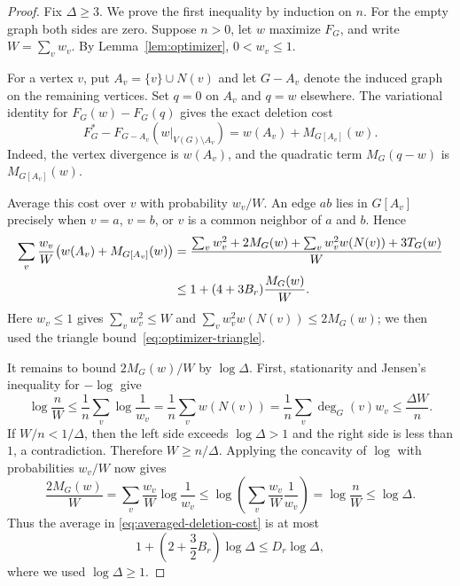 \begin{proof}
Fix $\Delta\ge3$.  We prove the first inequality by induction on $n$.
For the empty graph both sides are zero.  Suppose $n>0$, let $w$ maximize
$F_G$, and write $W=\sum_v w_v$.  By Lemma~\ref{lem:optimizer},
$0<w_v\le1$.

For a vertex $v$, put $A_v=\{v\}\cup N(v)$ and let
$G-A_v$ denote the induced graph on the remaining vertices.
Set $q=0$ on $A_v$ and $q=w$ elsewhere.  The variational identity
for $F_G(w)-F_G(q)$ gives the exact deletion cost
\begin{equation}
 F_G^*-F_{G-A_v}(w|_{V(G)\setminus A_v})
 =w(A_v)+M_{G[A_v]}(w).
 \label{eq:closed-neighborhood-cost}
\end{equation}
Indeed, the vertex divergence is $w(A_v)$, and the quadratic term
$M_G(q-w)$ is $M_{G[A_v]}(w)$.

Average this cost over $v$ with probability $w_v/W$.
An edge $ab$ lies in $G[A_v]$ precisely when $v=a$, $v=b$, or
$v$ is a common neighbor of $a$ and $b$.  Hence
\begin{align}
 \sum_v\frac{w_v}{W}
       \bigl(w(A_v)+M_{G[A_v]}(w)\bigr)
 &=\frac{\sum_v w_v^2+2M_G(w)
       +\sum_v w_v^2w(N(v))+3T_G(w)}{W} \notag\\
 &\le 1+(4+3B_r)\frac{M_G(w)}{W}.
 \label{eq:averaged-deletion-cost}
\end{align}
Here $w_v\le1$ gives $\sum_vw_v^2\le W$ and
$\sum_vw_v^2w(N(v))\le2M_G(w)$; we then used the triangle
bound~\eqref{eq:optimizer-triangle}.

It remains to bound $2M_G(w)/W$ by $\log\Delta$. First, stationarity
and Jensen's inequality for $-\log$ give
\begin{equation}
 \log\frac{n}{W}
 \le \frac1n\sum_v\log\frac1{w_v}
 =\frac1n\sum_v w(N(v))
 =\frac1n\sum_v \deg_G(v)w_v
 \le \frac{\Delta W}{n}.
 \label{eq:optimizer-total-weight}
\end{equation}
If $W/n<1/\Delta$, then the left side exceeds $\log\Delta>1$
and the right side is less than $1$, a contradiction. Therefore
$W\ge n/\Delta$. Applying the concavity of $\log$ with probabilities
$w_v/W$ now gives
\begin{equation}
 \frac{2M_G(w)}{W}
 =\sum_v\frac{w_v}{W}\log\frac1{w_v}
 \le \log\left(\sum_v\frac{w_v}{W}\frac1{w_v}\right)
 =\log\frac{n}{W}
 \le\log\Delta.
 \label{eq:optimizer-edge-weight}
\end{equation}
Thus the average in \eqref{eq:averaged-deletion-cost} is at most
\[
 1+\left(2+\frac32B_r\right)\log\Delta
 \le D_r\log\Delta,
\]
where we used $\log\Delta\ge1$.


\end{proof}
